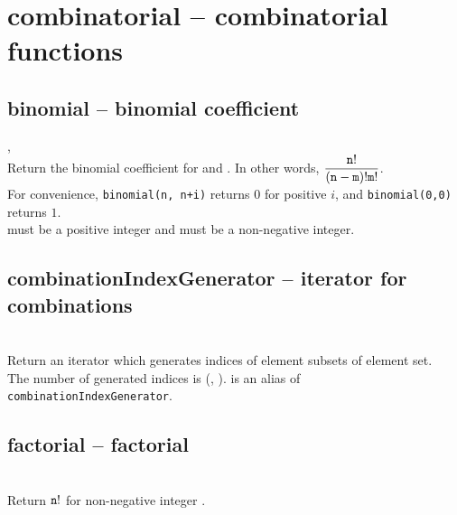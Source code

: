 

 \section{combinatorial -- combinatorial functions}
%
  \subsection{binomial -- binomial coefficient}
   {%
     ,\ %
   }{%
   }\\
   \spacing
   \quad Return the binomial coefficient for  and .
   In other words, $\displaystyle{\frac{{\texttt n} !}{({\texttt n} - {\texttt m}) ! {\texttt m} !}}$.\\
   \spacing
   \negok For convenience, {\tt binomial(n, n+i)} returns \(0\) for positive \(i\), and {\tt binomial(0,0)} returns \(1\).\\
   \spacing
   \quad {} must be a positive integer and  must be
   a non-negative integer. \\

  \subsection{combinationIndexGenerator -- iterator for combinations}

   \\
   \spacing
   \quad Return an iterator which generates indices of 
   element subsets of  element set.\\
   \spacing
   \quad The number of generated indices is (, ).
   \spacing 
   is an alias of {\tt combinationIndexGenerator}.\\

  \subsection{factorial -- factorial}
   \\
   \spacing
   \quad Return \({\texttt n}!\) for non-negative integer .\\

